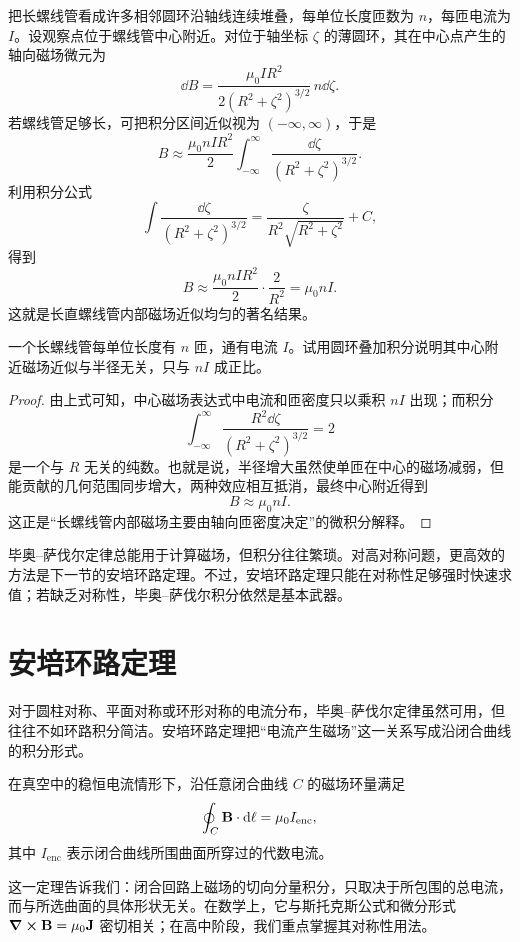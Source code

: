 把长螺线管看成许多相邻圆环沿轴线连续堆叠，每单位长度匝数为 $n$，每匝电流为 $I$。设观察点位于螺线管中心附近。对位于轴坐标 $\zeta$ 的薄圆环，其在中心点产生的轴向磁场微元为
\[
  \dd B=\frac{\mu_0 I R^2}{2(R^2+\zeta^2)^{3/2}}\,n\dd\zeta.
\]
若螺线管足够长，可把积分区间近似视为 $(-\infty,\infty)$，于是
\[
  B\approx \frac{\mu_0 n I R^2}{2}\int_{-\infty}^{\infty}\frac{\dd\zeta}{(R^2+\zeta^2)^{3/2}}.
\]
利用积分公式
\[
  \int \frac{\dd\zeta}{(R^2+\zeta^2)^{3/2}}=\frac{\zeta}{R^2\sqrt{R^2+\zeta^2}}+C,
\]
得到
\[
  B\approx \frac{\mu_0 n I R^2}{2}\cdot \frac{2}{R^2}=\mu_0 n I.
\]
这就是长直螺线管内部磁场近似均匀的著名结果。

\begin{example}
一个长螺线管每单位长度有 $n$ 匝，通有电流 $I$。试用圆环叠加积分说明其中心附近磁场近似与半径无关，只与 $nI$ 成正比。
\end{example}

\begin{proof}
由上式可知，中心磁场表达式中电流和匝密度只以乘积 $nI$ 出现；而积分
\[
  \int_{-\infty}^{\infty}\frac{R^2\dd\zeta}{(R^2+\zeta^2)^{3/2}}=2
\]
是一个与 $R$ 无关的纯数。也就是说，半径增大虽然使单匝在中心的磁场减弱，但能贡献的几何范围同步增大，两种效应相互抵消，最终中心附近得到
\[
  B\approx \mu_0 nI.
\]
这正是“长螺线管内部磁场主要由轴向匝密度决定”的微积分解释。
\end{proof}

\begin{remark}
毕奥--萨伐尔定律总能用于计算磁场，但积分往往繁琐。对高对称问题，更高效的方法是下一节的安培环路定理。不过，安培环路定理只能在对称性足够强时快速求值；若缺乏对称性，毕奥--萨伐尔积分依然是基本武器。
\end{remark}

\section{安培环路定理}

对于圆柱对称、平面对称或环形对称的电流分布，毕奥--萨伐尔定律虽然可用，但往往不如环路积分简洁。安培环路定理把“电流产生磁场”这一关系写成沿闭合曲线的积分形式。

\begin{law}[安培环路定理]
在真空中的稳恒电流情形下，沿任意闭合曲线 $C$ 的磁场环量满足
\[
  \oint_C \vb{B}\cdot\dd\vb{\ell}=\mu_0 I_{\mathrm{enc}},
\]
其中 $I_{\mathrm{enc}}$ 表示闭合曲线所围曲面所穿过的代数电流。
\end{law}

这一定理告诉我们：闭合回路上磁场的切向分量积分，只取决于所包围的总电流，而与所选曲面的具体形状无关。在数学上，它与斯托克斯公式和微分形式 $\curl\vb{B}=\mu_0\vb{J}$ 密切相关；在高中阶段，我们重点掌握其对称性用法。

